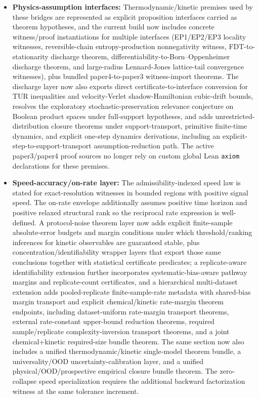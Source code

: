 \begin{itemize}
	\item \textbf{Physics-assumption interfaces:} Thermodynamic/kinetic premises used by these bridges are represented as explicit proposition interfaces carried as theorem hypotheses, and the current build now includes concrete witness/proof instantiations for multiple interfaces (EP1/EP2/EP3 locality witnesses, reversible-chain entropy-production nonnegativity witness, FDT-to-stationarity discharge theorem, differentiability-to-Born--Oppenheimer discharge theorem, and large-radius Lennard-Jones lattice-tail convergence witnesses), plus bundled paper4-to-paper3 witness-import theorems. The discharge layer now also exports direct certificate-to-interface conversion for TUR inequalities and velocity-Verlet shadow-Hamiltonian cubic-drift bounds, resolves the exploratory stochastic-preservation relevance conjecture on Boolean product spaces under full-support hypotheses, and adds unrestricted-distribution closure theorems under support-transport, primitive finite-time dynamics, and explicit one-step dynamics derivations, including an explicit-step-to-support-transport assumption-reduction path. The active paper3/paper4 proof sources no longer rely on custom global Lean \texttt{axiom} declarations for these premises.
	\item \textbf{Speed-accuracy/on-rate layer:} The admissibility-indexed speed law is stated for exact-resolution witnesses in bounded regions with positive signal speed. The on-rate envelope additionally assumes positive time horizon and positive relaxed structural rank so the reciprocal rate expression is well-defined. A protocol-noise theorem layer now adds explicit finite-sample absolute-error budgets and margin conditions under which threshold/ranking inferences for kinetic observables are guaranteed stable, plus concentration/identifiability wrapper layers that export those same conclusions together with statistical certificate predicates; a replicate-aware identifiability extension further incorporates systematic-bias-aware pathway margins and replicate-count certificates, and a hierarchical multi-dataset extension adds pooled-replicate finite-sample-rate metadata with shared-bias margin transport and explicit chemical/kinetic rate-margin theorem endpoints, including dataset-uniform rate-margin transport theorems, external rate-constant upper-bound reduction theorems, required sample/replicate complexity-inversion transport theorems, and a joint chemical+kinetic required-size bundle theorem. The same section now also includes a unified thermodynamic/kinetic single-model theorem bundle, a universality/OOD uncertainty-calibration layer, and a unified physical/OOD/prospective empirical closure bundle theorem. The zero-collapse speed specialization requires the additional backward factorization witness at the same tolerance increment.

\end{itemize}
